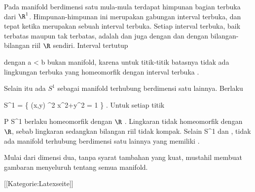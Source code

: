 {

Pada manifold berdimensi satu
mula-mula terdapat himpunan bagian terbuka dari $\R^1$. Himpunan-himpunan ini merupakan gabungan interval terbuka, dan  tepat ketika merupakan sebuah interval terbuka. Setiap interval terbuka, baik terbatas maupun tak terbatas, adalah
dan juga
dengan
\mathl{]0,1[}{} dan dengan bilangan-bilangan riil $\R$ sendiri. Interval tertutup

\mathbed {[a,b]} {dengan}
 {a < b} {}
 {} {} {} {}
bukan manifold, karena untuk titik-titik batasnya
 {} {}
tidak ada lingkungan terbuka yang homeomorfik dengan interval terbuka
 {} {.}

Selain itu ada  {}
 {} {}
$S^1$ sebagai manifold terhubung berdimensi satu lainnya. Berlaku

\mavergleichskettedisp
{\vergleichskette
{ S^1
}
{ =} { \left\{ (x,y) \in \R^2  \mid   x^2+y^2 = 1         \right\}
}
{ } {
}
{ } {
}
{ } {
}
}
{}{}{.}
Untuk setiap titik

\mavergleichskette
{\vergleichskette
{ P
}
{ \in }{ S^1
}
{  }{
}
{    }{
}
{   }{
}
}
{}{}{}
berlaku
 homeomorfik dengan $\R$
 {} {.}
Lingkaran tidak homeomorfik dengan $\R$, sebab lingkaran
sedangkan bilangan riil tidak kompak. Selain \mathkor {} {S^1} {dan} {\R} {}, tidak ada manifold terhubung berdimensi satu lainnya yang memiliki
 {} {.}

}
Mulai dari dimensi dua, tanpa syarat tambahan yang kuat, mustahil membuat gambaran menyeluruh tentang semua manifold.

 [[Kategorie:Latexseite]]
